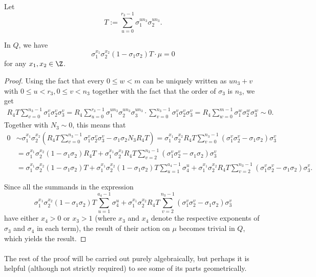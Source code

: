 Let $$T:=\sum_{u=0}^{r_3-1}\sigma_1^{un_3}\sigma_2^{un_3}.$$

\begin{lemma}\label{Tdiag}
In $Q$, we have $$\sigma_1^{x_1}\sigma_2^{x_2}(1-\sigma_1\sigma_2)T\cdot \mu=0$$
for any $x_1,x_2\in\Z$.
\end{lemma}
\begin{proof}
Using the fact that every $0\leq w<m$ can be uniquely written as $un_3+v$ with $0\leq u<r_3, 0\leq v<n_3$ together with the fact that the order of $\sigma_3$ is $n_3$, we get 
\begin{align*}
R_4T\sum_{v=0}^{n_3-1}\sigma_1^{v}\sigma_2^{v}\sigma_3^{v}=R_4\sum_{u=0}^{r_3-1}\sigma_1^{un_3}\sigma_2^{un_3}\sigma_3^{un_3}\cdot \sum_{v=0}^{n_3-1}\sigma_1^{v}\sigma_2^{v}\sigma_3^{v}=R_4\sum_{w=0}^{m-1}\sigma_1^{w}\sigma_2^{w}\sigma_3^{w}\sim 0.
\end{align*}
Together with $N_3\sim 0$, this means that 
\begin{align*}
0&\sim \sigma_1^{x_1}\sigma_2^{x_2}\left(R_4T \sum_{v=0}^{n_3-1}\sigma_1^{v}\sigma_2^{v}\sigma_3^{v}-\sigma_1\sigma_2N_3R_4T\right)=\sigma_1^{x_1}\sigma_2^{x_2}R_4T\sum_{v=0}^{n_3-1}\left(\sigma_1^{v}\sigma_2^{v}-\sigma_1\sigma_2\right)\sigma_3^{v}\\
&=\sigma_1^{x_1}\sigma_2^{x_2}(1-\sigma_1\sigma_2)R_4T+\sigma_1^{x_1}\sigma_2^{x_2}R_4T\sum_{v=2}^{n_3-1}\left(\sigma_1^{v}\sigma_2^{v}-\sigma_1\sigma_2\right)\sigma_3^{v}\\
&=\sigma_1^{x_1}\sigma_2^{x_2}(1\!-\!\sigma_1\sigma_2)T\!+\!
\sigma_1^{x_1}\sigma_2^{x_2}(1\!-\!\sigma_1\sigma_2)T\sum_{u=1}^{a_4-1}\sigma_4^u\!+\!\sigma_1^{x_1}\sigma_2^{x_2}R_4T\sum_{v=2}^{n_3-1}\left(\sigma_1^{v}\sigma_2^{v}-\sigma_1\sigma_2\right)\sigma_3^{v}.
\end{align*}

Since all the summands in the expression $$\sigma_1^{x_1}\sigma_2^{x_2}(1-\sigma_1\sigma_2)T\sum_{u=1}^{a_4-1}\sigma_4^u+\sigma_1^{x_1}\sigma_2^{x_2}R_4T\sum_{v=2}^{n_3-1}\left(\sigma_1^{v}\sigma_2^{v}-\sigma_1\sigma_2\right)\sigma_3^{v}$$
have either $x_4>0$ or $x_3>1$ (where $x_3$ and $x_4$ denote the respective exponents of $\sigma_3$ and $\sigma_4$ in each term), the result of their action on $\mu$ becomes trivial in $Q$, which yields the result.
\end{proof}
\paragraph*{}
The rest of the proof will be carried out purely algebraically, but perhaps it is helpful (although not strictly required) to see some of its parts geometrically.

